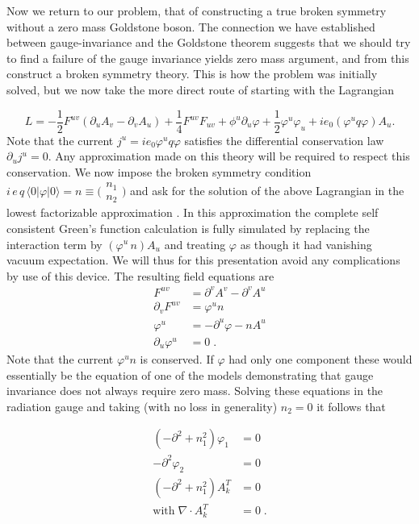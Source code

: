 \documentclass[%
  12pt,
  paper=letter,
  abstracton,
  pagesize=auto,
  version=last,
  DIV=calc
  ]{scrartcl}
\begin{document}
Now we return to our problem, that of constructing a true broken
symmetry without a zero mass Goldstone boson.  The connection we have
established between gauge-invariance and the Goldstone theorem
suggests that we should try to find a failure of the gauge invariance
yields zero mass argument, and from this construct a broken symmetry
theory.  This is how the problem was initially solved, but we now take
the more direct route of starting with the Lagrangian

\begin{equation*}
L=-\frac{1}{2}F^{uv} (\partial_u A_v - \partial_v A_u)+\frac{1}{4} F^{uv} F_{uv} + \phi^u \partial_u \varphi + \frac{1}{2} \varphi^u \varphi_u + i e_0 (\varphi^u q \varphi) A_u.
\end{equation*}
Note that the current $j^u=i e_0 \varphi^u q \varphi$
satisfies the differential conservation law $\partial_u j^u=0$.  Any
approximation made on this theory will be required to respect this
conservation. We now impose the broken symmetry condition $i\, e\, q\,
\langle 0|\varphi|0\rangle = n \equiv \bigl(\begin{smallmatrix}n_1 \\n_2\end{smallmatrix}\bigr)$ and ask for the solution
of the above Lagrangian in the lowest factorizable approximation
\cite{13}.  In this approximation the complete self consistent Green's
function calculation is fully simulated by replacing the interaction
term by $(\varphi^u\, n)A_u$ and treating $\varphi$ as though it had
vanishing vacuum expectation.  We will thus for this presentation
avoid any complications by use of this device.  The resulting field
equations are
\begin{align*}
F^{uv} &=\partial^v A^v-\partial^v A^u \\
\partial_v F^{uv} &=\varphi^u n \\
\varphi^u &=-\partial^u\varphi-n A^u\\
\partial_u\varphi^u &=0\; .
\end{align*}
Note that the current $\varphi^u n$ is conserved.  If $\varphi$ had
only one component these would essentially be the equation of one of
the models \cite {14} demonstrating that gauge invariance does not
always require zero mass.  Solving these equations in the radiation
gauge and taking (with no loss in generality) $n_2=0$ it follows that

\begin{align*}
(-\partial^2+n^2_1)\varphi_1 &=0 \\
-\partial^2\varphi_2 &=0 \\
(-\partial^2+n^2_1) A^T_k &=0 \\
\text{with}\; \nabla\cdot A^T_k &=0 \; .
\end{align*}
\end{document}
